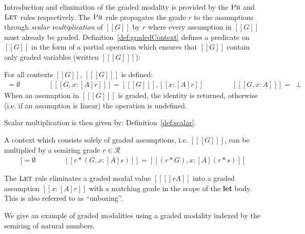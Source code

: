 Introduction and elimination of the graded modality is provided by the
$\textsc{Pr}$ and $\textsc{Let}$ rules respectively. The $\textsc{Pr}$ rule
propagates the grade $r$ to the assumptions through \emph{scalar multiplication}
of $[[G]]$ by $r$ where every assumption in $[[ G ]]$ must already be graded.
Definition~\ref{def:gradedContext} defines a predicate on $[[ G ]]$ in the form
of a partial operation which ensures that $[[ G ]]$ contain only graded
variables (written $[[ [ G ] ]]$):
\begin{definition}
  \label{def:gradedContext}
For all contexts $[[ G ]]$, $ [[ [G] ]]$ is defined:
\begin{align*}
    [ \emptyset ] = \emptyset
    \qquad\qquad
    [[ [ G, x : [A] r ]  ]] = [[ [ G ] ]], [[ x : [ A ] r ]]
    \qquad\qquad
   [[ [ G, x : A ] ]] =\ \perp
\end{align*}
When an assumption in $[[ [G] ]]$ is graded, the identity is returned, otherwise 
(i.e. if an assumption is linear) the operation is undefined.
\end{definition}
Scalar multiplication is then given by:
Definition~\ref{def:scalar}.
%
%
\begin{definition}
  \label{def:scalar}
 A context which consists solely of graded assumptions, i.e. $[[ [G] ]]$, can be
 multiplied by a semiring grade $r \in \mathcal{R}$
\begin{align*}
   [[ r * . ]] = \emptyset
    \qquad\qquad
    [[ r * (G , x : [ A ] s) ]] = [[ (r * G), x : [ A ] (r * s) ]]
\end{align*}
\end{definition}

The $\textsc{Let}$ rule eliminates a graded modal value $[[ [] r A ]]$
into a graded assumption $[[ x : [ A ] r ]]$ with a matching
grade in the scope of the \textbf{let} body. This is also referred to as
``unboxing''.

We give an example of graded modalities using a graded modality indexed
by the semiring of natural numbers.

